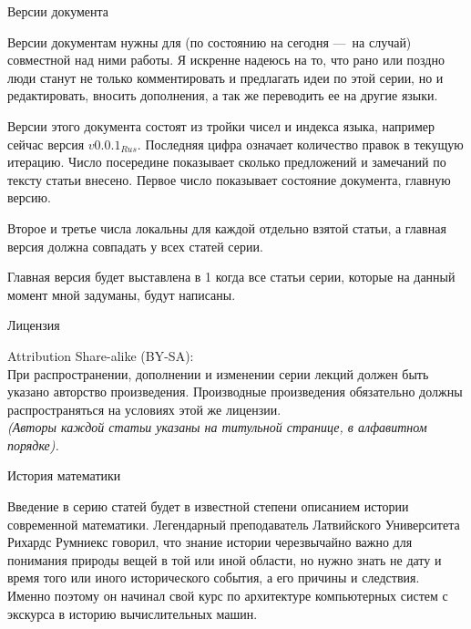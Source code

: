 \documentclass[math.tex]{subfiles}
\begin{document}
	\vspace{1cm}
	\LARGE{Версии документа}\\
	\normalsize
	
	Версии документам нужны для (по состоянию на сегодня —\ на случай) со\-вместной над ними работы.
Я искренне надеюсь на то, что рано или поздно люди станут не только комментировать и предлагать идеи по этой серии, но и редак\-тировать, вносить дополнения, а так же переводить ее на другие языки.
	
	Версии этого документа состоят из тройки чисел и индекса языка, например сейчас версия $v0.0.1_{Rus}$. 
Последняя цифра означает количество правок в текущую итерацию. 
Число посередине показывает сколько предложений и замечаний по тексту статьи внесено. 
Первое число показывает состояние документа, главную версию.

	Второе и третье числа локальны для каждой отдельно взятой статьи, а главная версия должна совпадать у всех статей серии.

	Главная версия будет выставлена в 1 когда все статьи серии, которые на данный момент мной задуманы, будут написаны.
	
	\vspace{1cm}
	\LARGE{Лицензия}\\
	\normalsize

	Attribution Share-alike (BY-SA):\\

	При распространении, дополнении и изменении серии лекций должен быть указано авторство про\-из\-ведения.
Производные произведения обязательно должны распространяться на условиях этой же лицензии.\\
	
	\emph{(Авторы каждой статьи указаны на титульной странице, в алфавитном порядке).}
	
	\vspace{1cm}
	\newpage
	\LARGE{История математики}
	\normalsize
	
	Введение в серию статей будет в известной степени описанием истории современной математики.
Легендарный преподаватель Латвийского Университета Рихардс Румниекс говорил, что знание истории черезвычайно важно для понимания природы вещей в той или иной области, но нужно знать не дату и время того или иного исторического события, а его причины и следствия.
Именно поэтому он начинал свой курс по архитектуре компьютерных систем с экскурса в историю вычислительных машин.
\end{document}
